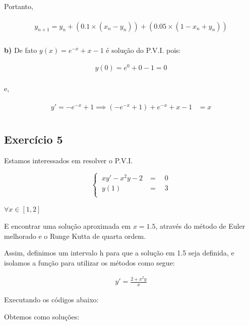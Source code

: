 \documentclass[paper=a4, fontsize=12pt]{scrartcl}
\numberwithin{equation}{section} %
\numberwithin{figure}{section} %
\numberwithin{table}{section} %
\newcommand{\euler}{e}
\begin{document}
		Portanto,

		\begin{align*}
			\begin{split}
				y_{n + 1} = y_n + (0.1\times (x_n - y_n)) + (0.05 \times (1 - x_n + y_n)) \\
			\end{split}
		\end{align*}

		\textbf{b)} De fato $y(x) = \euler^{-x} +x - 1$ é solução do P.V.I. pois:

		\begin{align*}
			y(0) = \euler^0 + 0 - 1 = 0 \\
		\end{align*}

		e,

		\begin{align*}
			\begin{split}
				y' = -\euler^{-x} + 1 \implies (-\euler^{-x} + 1) + \euler^{-x} +x - 1 &= x \\
			\end{split}
		\end{align*}

		\subsection{Exercício 5}

		Estamos interessados em resolver o P.V.I.

		\[
		\begin{cases}
		\ xy' - x^2y - 2&= \quad 0 \\
		\ y(1) &= \quad 3 \\
		\end{cases}
		\]

		$\forall x \in [1, 2]$

		E encontrar uma solução aproximada em $x = 1.5$, através do método de Euler melhorado e o Runge Kutta de quarta ordem.

		Assim, definimos um intervalo h para que a solução em 1.5 seja definida, e isolamos a função para utilizar os métodos como segue:

		\begin{align*}
			y' = \frac{2 + x^2y}{x}
		\end{align*}

		Executando os códigos abaixo:

		\hspace{2cm}

		

		

		Obtemos como soluções:


\end{document}
